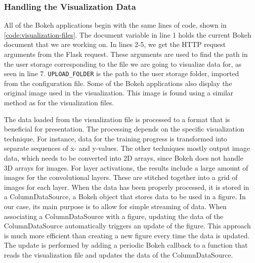 \subsubsection{Handling the Visualization Data}

All of the Bokeh applications begin with the same lines of code, shown in \autoref{code:visualization-files}. The document variable in line 1 holds the current Bokeh document that we are working on. In lines 2-5, we get the HTTP request arguments from the Flask request. These arguments are used to find the path in the user storage corresponding to the file we are going to visualize data for, as seen in line 7. \texttt{UPLOAD\_FOLDER} is the path to the user storage folder, imported from the configuration file. Some of the Bokeh applications also display the original image used in the visualization. This image is found using a similar method as for the visualization files. \\


\noindent The data loaded from the visualization file is processed to a format that is beneficial for presentation. The processing depends on the specific visualization technique. For instance, data for the training progress is transformed into separate sequences of x- and y-values. The other techniques mostly output image data, which needs to be converted into 2D arrays, since Bokeh does not handle 3D arrays for images. For layer activations, the results include a large amount of images for the convolutional layers. These are stitched together into a grid of images for each layer. When the data has been properly processed, it is stored in a ColumnDataSource, a Bokeh object that stores data to be used in a figure. In our case, its main purpose is to allow for simple streaming of data. When associating a ColumnDataSource with a figure, updating the data of the ColumnDataSource automatically triggers an update of the figure. This approach is much more efficient than creating a new figure every time the data is updated. The update is performed by adding a periodic Bokeh callback to a function that reads the visualization file and updates the data of the ColumnDataSource.


